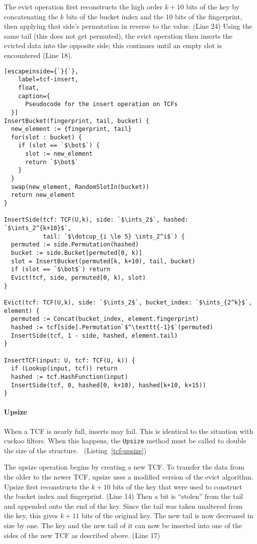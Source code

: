 \documentclass[sigconf, nonacm]{acmart}
\newcommand{\ints}{\mathbb{Z}}
\newcommand{\dotcup}{\ensuremath{\mathaccent\cdot\cup}}
\begin{document}
The evict operation first reconstructs the high order $k + 10$ bits of the key by concatenating the $k$ bits of the bucket index and the $10$ bits of the fingerprint, then applying that side's permutation in reverse to the value. (Line 24)
Using the same tail (this does not get permuted), the evict operation then inserts the evicted data into the opposite side;
this continues until an empty slot is encountered (Line 18).

\begin{lstlisting}[escapeinside={`}{`},
    label=tcf-insert,
    float,
    caption={
      Pseudocode for the insert operation on TCFs
  }]
InsertBucket(fingerprint, tail, bucket) {
  new_element := {fingerprint, tail}
  for(slot : bucket) {
    if (slot == `$\bot$`) {
      slot := new_element
      return `$\bot$`
    }
  }
  swap(new_element, RandomSlotIn(bucket))
  return new_element
}

InsertSide(tcf: TCF(U,k), side: `$\ints_2$`, hashed: `$\ints_2^{k+10}$`,
           tail: `$\dotcup_{i \le 5} \ints_2^i$`) {
  permuted := side.Permutation(hashed)
  bucket := side.Bucket[permuted[0, k)]
  slot = InsertBucket(permuted[k, k+10), tail, bucket)
  if (slot == `$\bot$`) return
  Evict(tcf, side, permuted[0, k), slot)
}

Evict(tcf: TCF(U,k), side: `$\ints_2$`, bucket_index: `$\ints_{2^k}$`, element) {
  permuted := Concat(bucket_index, element.fingerprint)
  hashed := tcf[side].Permutation`$^\texttt{-1}$`(permuted)
  InsertSide(tcf, 1 - side, hashed, element.tail)
}

InsertTCF(input: U, tcf: TCF(U, k)) {
  if (Lookup(input, tcf)) return
  hashed := tcf.HashFunction(input)
  InsertSide(tcf, 0, hashed[0, k+10), hashed[k+10, k+15))
}
\end{lstlisting}

\paragraph{Upsize}
When a TCF is nearly full, inserts may fail.
This is identical to the situation with cuckoo filters.
When this happens, the \texttt{Upsize} method must be called to double the size of the structure. ~(Listing~\ref{tcf-upsize})

The upsize operation begins by creating a new TCF.
To transfer the data from the older to the newer TCF, upsize uses a modified version of the evict algorithm.
Upsize first reconstructs the $k+10$ bits of the key that were used to construct the bucket index and fingerprint. (Line 14)
Then a bit is ``stolen'' from the tail and appended onto the end of the key.
Since the tail was taken unaltered from the key, this gives $k+11$ bits of the original key.
The new tail is now decreased in size by one.
The key and the new tail of it can now be inserted into one of the sides of the new TCF as described above. (Line 17)
\end{document}

